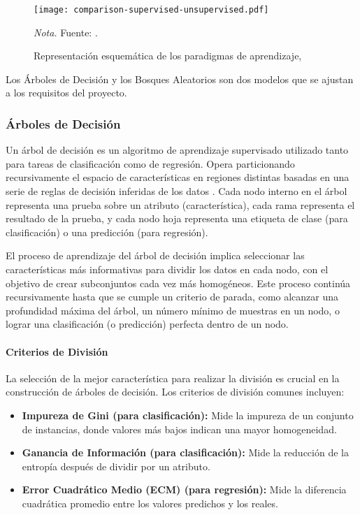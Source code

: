 \begin{figure}
    \centering
    \caption{Representación esquemática de los paradigmas de aprendizaje, } \label{fig:mlComparison}
    \texttt{[image: comparison-supervised-unsupervised.pdf]}

    \vspace{0.5em}
    \begin{minipage}{\textwidth}
        \small\textit{Nota.} Fuente: \textcite{morimoto2021}.
    \end{minipage}
\end{figure}

Los Árboles de Decisión y los Bosques Aleatorios son dos modelos que se ajustan a los requisitos del proyecto.

\subsubsection{Árboles de Decisión}
Un árbol de decisión es un algoritmo de aprendizaje supervisado utilizado tanto para tareas de clasificación como de regresión.
Opera particionando recursivamente el espacio de características en regiones distintas basadas en una serie de reglas de decisión inferidas de los datos \parencite{quinlan1986induction}.
Cada nodo interno en el árbol representa una prueba sobre un atributo (característica), cada rama representa el resultado de la prueba, y cada nodo hoja representa una etiqueta de clase (para clasificación) o una predicción (para regresión).

El proceso de aprendizaje del árbol de decisión implica seleccionar las características más informativas para dividir los datos en cada nodo, con el objetivo de crear subconjuntos cada vez más homogéneos.
Este proceso continúa recursivamente hasta que se cumple un criterio de parada, como alcanzar una profundidad máxima del árbol, un número mínimo de muestras en un nodo, o lograr una clasificación (o predicción) perfecta dentro de un nodo.

\paragraph{Criterios de División}
La selección de la mejor característica para realizar la división es crucial en la construcción de árboles de decisión.
Los criterios de división comunes incluyen:

\begin{itemize}
    \item \textbf{Impureza de Gini (para clasificación):} Mide la impureza de un conjunto de instancias, donde valores más bajos indican una mayor homogeneidad.
    \item \textbf{Ganancia de Información (para clasificación):} Mide la reducción de la entropía después de dividir por un atributo.
    \item \textbf{Error Cuadrático Medio (ECM) (para regresión):} Mide la diferencia cuadrática promedio entre los valores predichos y los reales.
\end{itemize}

